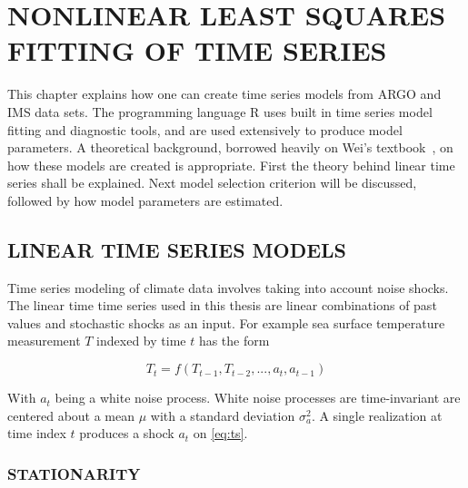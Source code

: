 \appendix
%
%

\chapter{NONLINEAR LEAST SQUARES FITTING OF TIME SERIES}\label{append:TS}

This chapter explains how one can create time series models from ARGO and IMS data sets. The programming language R uses built in time series model fitting and diagnostic tools, and are used extensively to produce model parameters. A theoretical background, borrowed heavily on Wei's textbook~\cite{wei2006time}, on how these models are created is appropriate. First the theory behind linear time series shall be explained. Next model selection criterion will be discussed, followed by how model parameters are estimated.

\section{LINEAR TIME SERIES MODELS}

Time series modeling of climate data involves taking into account noise shocks. The linear time time series used in this thesis are linear combinations of past values and stochastic shocks as an input. For example sea surface temperature measurement $T$ indexed by time $t$ has the form

\begin{equation}\label{eq:ts}
T_t = f(T_{t-1}, T_{t-2}, ..., a_t, a_{t-1})
\end{equation}

With $a_t$ being a white noise process. White noise processes are time-invariant are centered about a mean $\mu$ with a standard deviation $\sigma^2_a$. A single realization at time index $t$ produces a shock $a_t$ on \ref{eq:ts}. 

\subsection{STATIONARITY}


